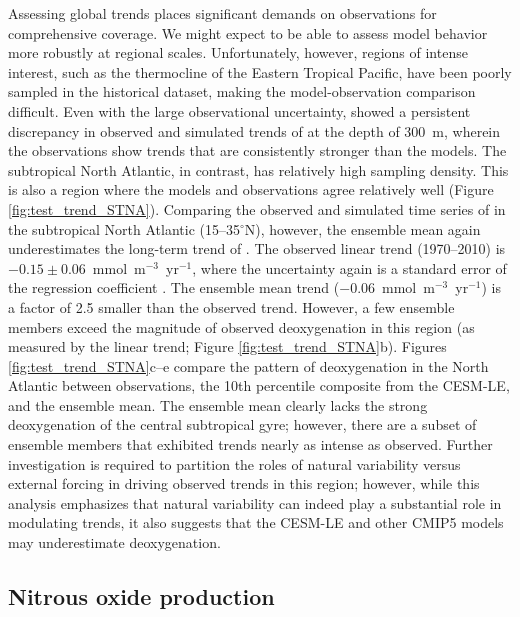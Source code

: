 \documentclass[draft,linenumbers]{report_chapter}
\begin{document}
Assessing global trends places significant demands on observations for comprehensive coverage.
We might expect to be able to assess model behavior more robustly at regional scales.
Unfortunately, however, regions of intense interest, such as the thermocline of the Eastern Tropical Pacific, have been poorly sampled in the historical dataset, making the model-observation comparison difficult.
Even with the large observational uncertainty, \citet{Oschlies-Duteil-etal-2017} showed a persistent discrepancy in observed and simulated trends of  at the depth of 300~m, wherein the observations show trends that are consistently stronger than the models.
The subtropical North Atlantic, in contrast, has relatively high sampling density.
This is also a region where the models and observations agree relatively well (Figure \ref{fig:test_trend_STNA}).
Comparing the observed and simulated time series of  in the subtropical North Atlantic (15--35$^\circ$N), however, the ensemble mean again underestimates the long-term trend of .
The observed linear trend (1970--2010) is $-0.15\pm0.06$~mmol~m$^{-3}$~yr$^{-1}$, where the uncertainty again is a standard error of the regression coefficient \citep{Santer-Mears-etal-2011}.
The ensemble mean trend ($-0.06$~mmol~m$^{-3}$~yr$^{-1}$) is a factor of 2.5 smaller than the observed trend.
However, a few ensemble members exceed the magnitude of observed deoxygenation in this region (as measured by the linear trend; Figure \ref{fig:test_trend_STNA}b).
Figures \ref{fig:test_trend_STNA}c--e compare the pattern of deoxygenation in the North Atlantic between observations, the 10th percentile composite from the CESM-LE, and the ensemble mean.
The ensemble mean clearly lacks the strong deoxygenation of the central subtropical gyre; however, there are a subset of ensemble members that exhibited trends nearly as intense as observed.
Further investigation is required to partition the roles of natural variability versus external forcing in driving observed  trends in this region; however, while this analysis emphasizes that natural variability can indeed play a substantial role in modulating trends, it also suggests that the CESM-LE and other CMIP5 models may underestimate deoxygenation.

\subsection{Nitrous oxide production}\label{loc:n2o}
\end{document}
